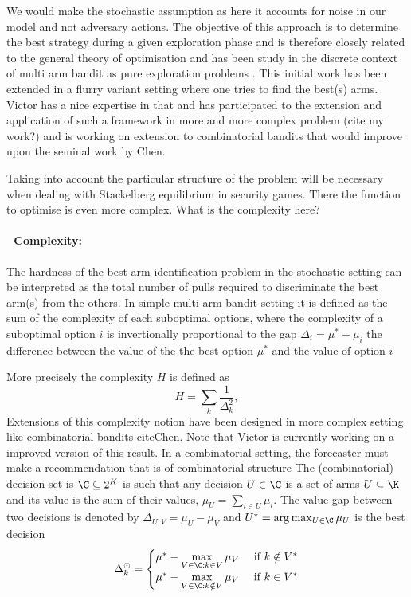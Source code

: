 We would make the stochastic assumption as here it accounts for noise in our model and not adversary actions.
 The objective of this  approach is to determine  the best strategy during a given exploration phase and  is therefore  closely related to the general theory of optimisation and has been study in the discrete context of multi arm bandit as pure exploration problems \cite{Audibert10BA}. This initial work has been extended in a flurry variant setting where one tries to find the best(s) arms.
Victor has a nice expertise in that and has participated to the extension and application of such a framework in more and more complex problem (cite my work?) and is working on extension to combinatorial bandits that would improve upon the seminal work by Chen.


 Taking into account the particular  structure of the problem will be necessary when dealing with Stackelberg equilibrium in security games. There the function to optimise is even more complex. What is the complexity here?
 
 \paragraph{\textbullet$\;$  Complexity:} The hardness of the best arm identification problem in the stochastic setting can be interpreted as the total number of pulls required to discriminate the best arm(s) from the others. In simple multi-arm bandit setting it is defined as the sum of the complexity of each suboptimal options, where the complexity of a suboptimal option $i$ is invertionally proportional to the gap $\Delta_i= \mu^*- \mu_i$  the difference between the value of the the best option $\mu^*$ and the value of option $i$
 
 More precisely the complexity $H$ is  defined as
%
\begin{equation}
H = \sum_{k} \frac{1}{\Delta_k^2},
\end{equation}
%
Extensions of this complexity notion have been designed in more complex setting like combinatorial bandits cite{Chen}. Note that Victor is currently working on a improved version of this result. In a combinatorial setting, the forecaster must make a recommendation that is of combinatorial structure
 The (combinatorial) decision set is $\C\subseteq 2^K$ is such that any decision $U \in \C$ is a set of arms $U\subseteq \K$ and its value is the sum of their values, $\mu_U = \sum_{i \in U} \mu_i$. The value gap between two decisions is denoted by $\Delta_{U,V} = \mu_U - \mu_V$ and $U^* = \arg\max_{U\in\C} \mu_U$ is the best decision 
 \begin{align*}
\Delta^\odot_k = 
\begin{cases} 
\mu^* - \max\limits_{V\in\C: k\in V} \mu_V & \text{ if } k\notin V^* \\
\mu^* - \max\limits_{V\in\C: k\notin V} \mu_V & \text{ if } k\in V^* \\
\end{cases}
\end{align*}

